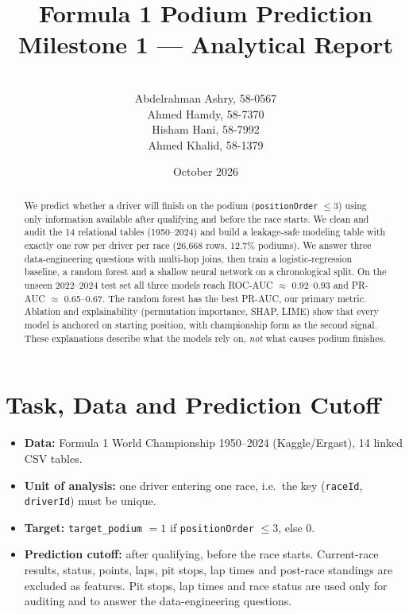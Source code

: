 \documentclass[11pt,a4paper]{article}
\title{\textbf{Formula 1 Podium Prediction}\\[4pt]\large Milestone 1 --- Analytical Report}
\author{
  \\ Abdelrahman Ashry, 58-0567
  \\ Ahmed Hamdy, 58-7370
  \\ Hisham Hani, 58-7992
  \\ Ahmed Khalid, 58-1379}
\date{October 2026}
\newcommand{\ft}[1]{\texttt{#1}}
\begin{document}
\maketitle

\begin{abstract}
We predict whether a driver will finish on the podium (\ft{positionOrder} $\leq 3$) using only information available after qualifying and before the race starts. We clean and audit the 14 relational tables (1950--2024) and build a leakage-safe modeling table with exactly one row per driver per race (26,668 rows, 12.7\% podiums). We answer three data-engineering questions with multi-hop joins, then train a logistic-regression baseline, a random forest and a shallow neural network on a chronological split. On the unseen 2022--2024 test set all three models reach ROC-AUC $\approx$ 0.92--0.93 and PR-AUC $\approx$ 0.65--0.67. The random forest has the best PR-AUC, our primary metric. Ablation and explainability (permutation importance, SHAP, LIME) show that every model is anchored on starting position, with championship form as the second signal. These explanations describe what the models rely on, \emph{not} what causes podium finishes.
\end{abstract}

\tableofcontents

\section{Task, Data and Prediction Cutoff}
\begin{itemize}
  \item \textbf{Data:} Formula 1 World Championship 1950--2024 (Kaggle/Ergast), 14 linked CSV tables.
  \item \textbf{Unit of analysis:} one driver entering one race, i.e.\ the key (\ft{raceId}, \ft{driverId}) must be unique.
  \item \textbf{Target:} \ft{target\_podium} $= 1$ if \ft{positionOrder} $\leq 3$, else 0.
  \item \textbf{Prediction cutoff:} after qualifying, before the race starts. Current-race results, status, points, laps, pit stops, lap times and post-race standings are excluded as features. Pit stops, lap times and race status are used only for auditing and to answer the data-engineering questions.
\end{itemize}

\end{document}
